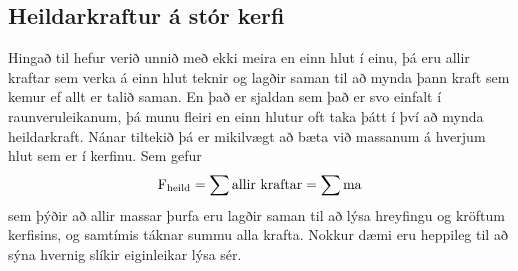 \subsection{Heildarkraftur á stór kerfi}
Hingað til hefur verið unnið með ekki meira en einn hlut í einu, þá eru allir
kraftar sem verka á einn hlut teknir og lagðir saman til að mynda þann kraft sem
kemur ef allt er talið saman. En það er sjaldan sem það er svo einfalt
í raunveruleikanum, þá munu fleiri en einn hlutur oft taka þátt í því að mynda
heildarkraft. Nánar tiltekið þá er mikilvægt að bæta við massanum á hverjum hlut
sem er í kerfinu. Sem gefur
\begin{equation}
	\textrm{F}_\text{heild} = \sum \text{allir kraftar} = \sum \textrm{m} \textrm{a}
\end{equation}
sem þýðir að allir massar þurfa eru lagðir saman til að lýsa hreyfingu og
kröftum kerfisins, og samtímis táknar summu alla krafta. Nokkur dæmi eru heppileg til að
sýna hvernig slíkir eiginleikar lýsa sér.
